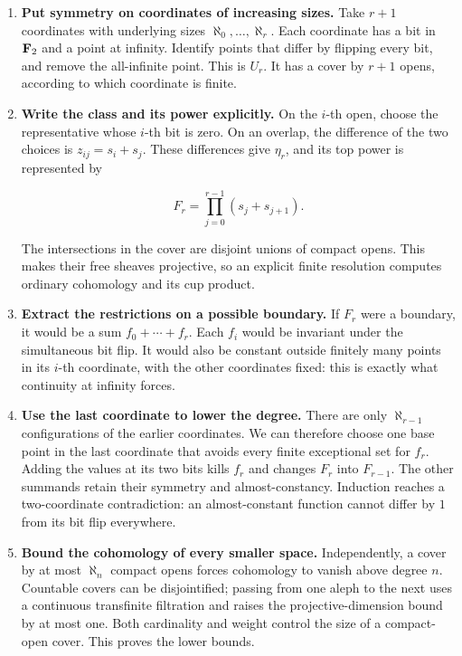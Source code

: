 \begin{enumerate}
\item \textbf{Put symmetry on coordinates of increasing sizes.}
Take \(r+1\) coordinates with underlying sizes
\(\aleph_0,\ldots,\aleph_r\). Each coordinate has a bit in \(\mathbf F_2\)
and a point at infinity. Identify points that differ by flipping every
bit, and remove the all-infinite point. This is \(U_r\). It has a cover
by \(r+1\) opens, according to which coordinate is finite.

\item \textbf{Write the class and its power explicitly.}
On the \(i\)-th open, choose the representative whose \(i\)-th bit is
zero. On an overlap, the difference of the two choices is
\(z_{ij}=s_i+s_j\). These differences give \(\eta_r\), and its top
power is represented by

\[
F_r=\prod_{j=0}^{r-1}(s_j+s_{j+1}).
\]

The intersections in the cover are disjoint unions of compact opens.
This makes their free sheaves projective, so an explicit finite
resolution computes ordinary cohomology and its cup product.

\item \textbf{Extract the restrictions on a possible boundary.}
If \(F_r\) were a boundary, it would be a sum
\(f_0+\cdots+f_r\). Each \(f_i\) would be invariant under the
simultaneous bit flip. It would also be constant outside finitely many
points in its \(i\)-th coordinate, with the other coordinates fixed:
this is exactly what continuity at infinity forces.

\item \textbf{Use the last coordinate to lower the degree.}
There are only \(\aleph_{r-1}\) configurations of the earlier
coordinates. We can therefore choose one base point in the last
coordinate that avoids every finite exceptional set for \(f_r\).
Adding the values at its two bits kills \(f_r\) and changes \(F_r\)
into \(F_{r-1}\). The other summands retain their symmetry and
almost-constancy. Induction reaches a two-coordinate contradiction:
an almost-constant function cannot differ by \(1\) from its bit flip
everywhere.

\item \textbf{Bound the cohomology of every smaller space.}
Independently, a cover by at most \(\aleph_n\) compact opens forces
cohomology to vanish above degree \(n\). Countable covers can be
disjointified; passing from one aleph to the next uses a continuous
transfinite filtration and raises the projective-dimension bound by
at most one. Both cardinality and weight control the size of a
compact-open cover. This proves the lower bounds.
\end{enumerate}

